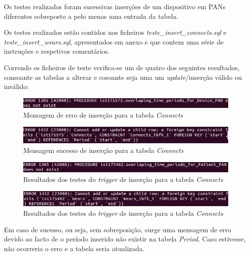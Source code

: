 \documentclass[a4paper]{article}
\begin{document}
\vskip 7mm
Os testes realizados foram sucessivas inserções de um dispositivo em PANs diferentes sobreposto a pelo menos uma entrada da tabela.

Os testes realizados estão contidos nos ficheiros \textit{teste\_insert\_connects.sql} e \textit{teste\_insert\_wears.sql}, apresentados em anexo e que contem uma série de instruções e respetivos comentários.

Correndo os ficheiros de teste verifica-se um de quatro dos seguintes resultados, consoante as tabelas a alterar e cosoante seja uma um \textit{update}/inserção válido ou inválido:

\begin{figure}[ht!]
\centering
\includegraphics[scale=0.7]{erro_connect.png}
\caption{Mensagem de erro de inserção para a tabela \textit{Connects}}
\end{figure}

\begin{figure}[ht!]
\centering
\includegraphics[scale=0.7]{good_connect.png}
\caption{Mensagem sucesso de inserção para a tabela \textit{Connects}}
\end{figure}

\begin{figure}[ht!]
\centering
\includegraphics[scale=0.53]{error_wears.jpg}
\caption{Resultados dos testes do \textit{trigger} de inserção para a tabela \textit{Connects}}
\end{figure}

\begin{figure}[ht!]
\centering
\includegraphics[scale=0.53]{good_wears.jpg}
\caption{Resultados dos testes do \textit{trigger} de inserção para a tabela \textit{Connects}}
\end{figure}

Em caso de sucesso, ou seja, sem sobreposição, surge uma mensagem de erro devido ao facto de o período inserido não existir na tabela \textit{Period}. Caso estivesse, não ocorreria o erro e a tabela seria atualizada.
\pagebreak
\end{document}
